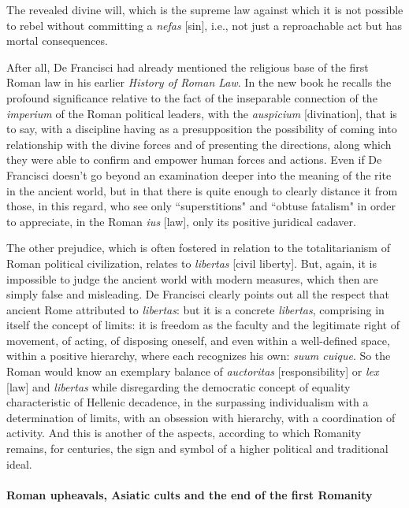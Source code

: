 \begin{quotex}
The revealed divine will, which is the supreme law against which it is not possible to rebel without committing a \emph{nefas} [sin], i.e., not just a reproachable act but has mortal consequences. 

\end{quotex}
After all, De Francisci had already mentioned the religious base of the first Roman law in his earlier \emph{History of Roman Law}. In the new book he recalls the profound significance relative to the fact of the inseparable connection of the \emph{imperium} of the Roman political leaders, with the \emph{auspicium} [divination], that is to say, with a discipline having as a presupposition the possibility of coming into relationship with the divine forces and of presenting the directions, along which they were able to confirm and empower human forces and actions. Even if De Francisci doesn't go beyond an examination deeper into the meaning of the rite in the ancient world, but in that there is quite enough to clearly distance it from those, in this regard, who see only ``superstitions" and ``obtuse fatalism" in order to appreciate, in the Roman \emph{ius} [law], only its positive juridical cadaver.

The other prejudice, which is often fostered in relation to the totalitarianism of Roman political civilization, relates to \emph{libertas} [civil liberty]. But, again, it is impossible to judge the ancient world with modern measures, which then are simply false and misleading. De Francisci clearly points out all the respect that ancient Rome attributed to \emph{libertas}: but it is a concrete \emph{libertas}, comprising in itself the concept of limits: it is freedom as the faculty and the legitimate right of movement, of acting, of disposing oneself, and even within a well-defined space, within a positive hierarchy, where each recognizes his own: \emph{suum cuique}. So the Roman would know an exemplary balance of \emph{auctoritas} [responsibility] or \emph{lex} [law] and \emph{libertas} while disregarding the democratic concept of equality characteristic of Hellenic decadence, in the surpassing individualism with a determination of limits, with an obsession with hierarchy, with a coordination of activity. And this is another of the aspects, according to which Romanity remains, for centuries, the sign and symbol of a higher political and traditional ideal.

\paragraph*{Roman upheavals, Asiatic cults and the end of the first Romanity}

